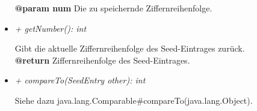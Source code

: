 \begin{itemize}
\begin{leftbar}[0.9\linewidth]
                    \textbf{@param num} Die zu speichernde Ziffernreihenfolge.\\
                \end{leftbar}
            \item \textit{+ getNumber(): int}
                \begin{leftbar}[0.9\linewidth]
                    Gibt die aktuelle Ziffernreihenfolge des Seed-Eintrages zurück.\\
                    \textbf{@return} Ziffernreihenfolge des Seed-Eintrages.
                \end{leftbar}
            \item \textit{+ compareTo(SeedEntry other): int}
                \begin{leftbar}[0.9\linewidth]
                    Siehe dazu java.lang.Comparable\#compareTo(java.lang.Object).
                \end{leftbar}
        \end{itemize}


\pagebreak